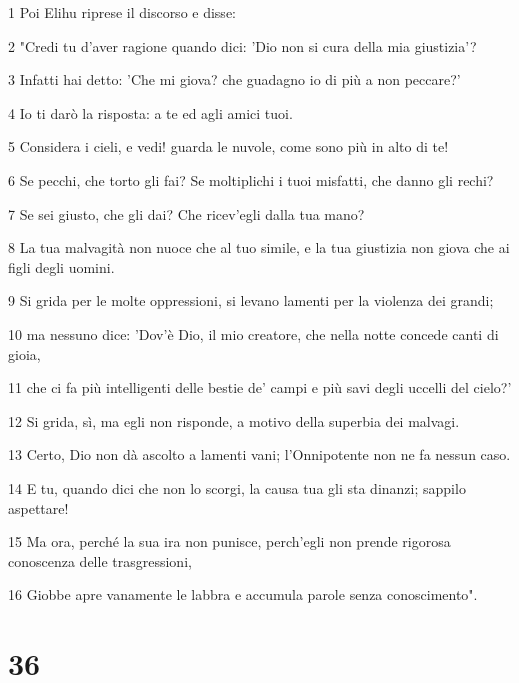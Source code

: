 \par 1 Poi Elihu riprese il discorso e disse:
\par 2 "Credi tu d'aver ragione quando dici: 'Dio non si cura della mia giustizia'?
\par 3 Infatti hai detto: 'Che mi giova? che guadagno io di più a non peccare?'
\par 4 Io ti darò la risposta: a te ed agli amici tuoi.
\par 5 Considera i cieli, e vedi! guarda le nuvole, come sono più in alto di te!
\par 6 Se pecchi, che torto gli fai? Se moltiplichi i tuoi misfatti, che danno gli rechi?
\par 7 Se sei giusto, che gli dai? Che ricev'egli dalla tua mano?
\par 8 La tua malvagità non nuoce che al tuo simile, e la tua giustizia non giova che ai figli degli uomini.
\par 9 Si grida per le molte oppressioni, si levano lamenti per la violenza dei grandi;
\par 10 ma nessuno dice: 'Dov'è Dio, il mio creatore, che nella notte concede canti di gioia,
\par 11 che ci fa più intelligenti delle bestie de' campi e più savi degli uccelli del cielo?'
\par 12 Si grida, sì, ma egli non risponde, a motivo della superbia dei malvagi.
\par 13 Certo, Dio non dà ascolto a lamenti vani; l'Onnipotente non ne fa nessun caso.
\par 14 E tu, quando dici che non lo scorgi, la causa tua gli sta dinanzi; sappilo aspettare!
\par 15 Ma ora, perché la sua ira non punisce, perch'egli non prende rigorosa conoscenza delle trasgressioni,
\par 16 Giobbe apre vanamente le labbra e accumula parole senza conoscimento".

\chapter{36}


